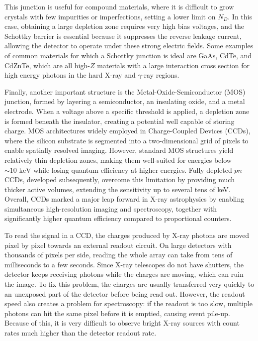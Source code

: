 This junction is useful for compound materials, where it is difficult to grow crystals with few impurities or imperfections, setting a lower limit on $N_D$. In this case, obtaining a large depletion zone requires very high bias voltages, and the Schottky barrier is essential because it suppresses the reverse leakage current, allowing the detector to operate under these strong electric fields. Some examples of common materials for which a Schottky junction is ideal are GaAs, CdTe, and CdZnTe, which are all high-$Z$ materials with a large interaction cross section for high energy photons in the hard X-ray and $\gamma$-ray regions.

Finally, another important structure is the Metal-Oxide-Semiconductor (MOS) junction, formed by layering a semiconductor, an insulating oxide, and a metal electrode. When a voltage above a specific threshold is applied, a depletion zone is formed beneath the insulator, creating a potential well capable of storing charge. MOS architectures widely employed in Charge-Coupled Devices (CCDs), where the silicon substrate is segmented into a two-dimensional grid of pixels to enable spatially resolved imaging. However, standard MOS structures yield relatively thin depletion zones, making them well-suited for energies below $\sim 10\text{ keV}$ while losing quantum efficiency at higher energies. Fully depleted $pn$CCDs, developed subsequently, overcome this limitation by providing much thicker active volumes, extending the sensitivity up to several tens of keV. Overall, CCDs marked a major leap forward in X-ray astrophysics by enabling simultaneous high-resolution imaging and spectroscopy, together with significantly higher quantum efficiency compared to proportional counters.

To read the signal in a CCD, the charges produced by X-ray photons are moved pixel by pixel towards an external readout circuit. On large detectors with thousands of pixels per side, reading the whole array can take from tens of milliseconds to a few seconds. Since X-ray telescopes do not have shutters, the detector keeps receiving photons while the charges are moving, which can ruin the image. To fix this problem, the charges are usually transferred very quickly to an unexposed part of the detector before being read out. However, the readout speed also creates a problem for spectroscopy: if the readout is too slow, multiple photons can hit the same pixel before it is emptied, causing event pile-up. Because of this, it is very difficult to observe bright X-ray sources with count rates much higher than the detector readout rate.

